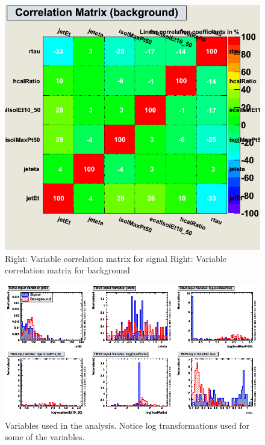 \begin{figure}[h]
\begin{minipage}{7.0cm}
\includegraphics[width=1.0\textwidth]{images/ahCorrelationMatrixB.png}
\end{minipage}
\begin{minipage}{3.0cm}
\caption{Right: Variable correlation matrix for signal Right: Variable correlation matrix for background}
\end{minipage}
\label{fig:ahCorrelationMatrix}
\end{figure}


\begin{figure}[h]
\begin{center}
\includegraphics[width=1.0\textwidth]{images/ahVariables_c1.png}
\caption{Variables used in the analysis. Notice log transformations used for some of the variables.}
\label{fig:variables_c1}
\end{center}
\end{figure}

